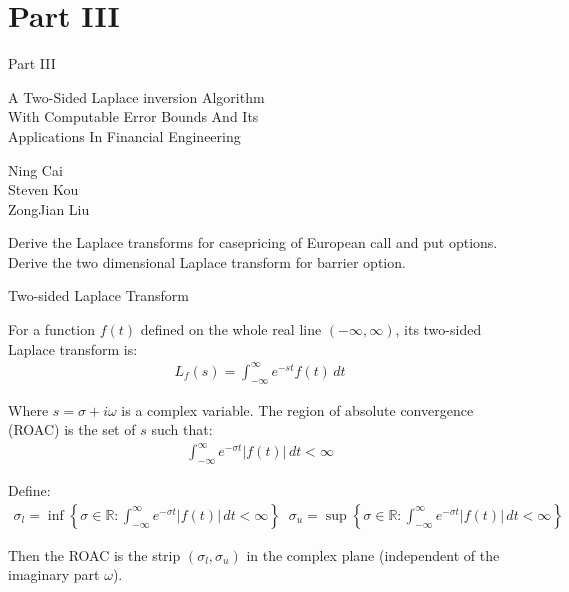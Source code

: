 \documentclass{beamer}
\begin{document}
 \section{Part III}
\begin{frame}{Part III}

    \begin{center}
        A Two-Sided Laplace inversion Algorithm \\
       With Computable Error Bounds And Its \\
       Applications In Financial Engineering
    \end{center}
    \vspace{2em}
    \begin{center}
        Ning Cai\\
        Steven Kou\\
        ZongJian Liu
    \end{center}
    \vspace{3em}
    \par  Derive the Laplace transforms for 
    casepricing of European call and put options. Derive the two dimensional Laplace transform for barrier option.

\end{frame}

\begin{frame}{Two-sided Laplace Transform}


    {\footnotesize \footnotesize
    \par For a function \( f(t) \) defined on the whole real line \((-\infty, \infty)\), its two-sided Laplace transform is:
    \begin{align*}
        L_f(s) = \int_{-\infty}^{\infty} e^{-st}f(t)\,dt
    \end{align*}
    \par  \pause  Where \( s = \sigma + i\omega \) is a complex variable. The region of absolute convergence (ROAC) is the set of $s$ such that:
    \begin{align*}
        \int_{-\infty}^{\infty} e^{-\sigma t}|f(t)|\,dt < \infty
    \end{align*}
    \par   \pause Define: 
    \begin{align*}
         \sigma_l = \inf \left\{ \sigma \in \mathbb{R} : \int_{-\infty}^{\infty} e^{-\sigma t}|f(t)|\,dt < \infty \right\}\;\;
          \sigma_u = \sup \left\{ \sigma \in \mathbb{R} : \int_{-\infty}^{\infty} e^{-\sigma t}|f(t)|\,dt < \infty \right\}
    \end{align*}
    \par Then the ROAC is the strip \((\sigma_l, \sigma_u)\) in the complex plane (independent of the imaginary part \(\omega\)).
    }
    
\end{frame}
\end{document}
